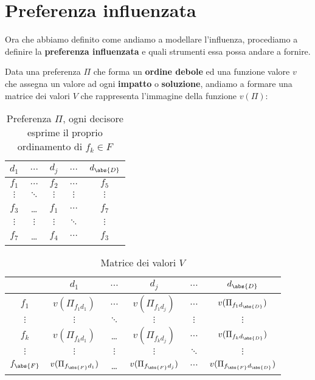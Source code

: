 \documentclass[\main/main.tex]{subfiles}
\begin{document}
\clearpage

\section{Preferenza influenzata}
Ora che abbiamo definito come andiamo a modellare l'influenza, procediamo a definire la \textbf{preferenza influenzata} e quali strumenti essa possa andare a fornire.

Data una preferenza $\Pi$ che forma un \textbf{ordine debole} ed una funzione valore $v$ che assegna un valore ad ogni \textbf{impatto} o \textbf{soluzione}, andiamo a formare una matrice dei valori $V$ che rappresenta l'immagine della funzione $v(\Pi)$:

\begin{table}
	\begin{tabular}{|c|c|c|c|c|}
		\hline
		$d_1$    & $\ldots$ & $d_j$    & $\ldots$ & $d_{\abs{D}}$ \\
		\hline
		$f_1$    & $\ldots$ & $f_2$    & $\ldots$ & $f_5$         \\
		\hline
		$\vdots$ & $\ddots$ & $\vdots$ & $\vdots$ & $\vdots$      \\
		\hline
		$f_3$    & \ldots   & $f_1$    & $\ldots$ & $f_7$         \\
		\hline
		$\vdots$ & $\vdots$ & $\vdots$ & $\ddots$ & $\vdots$      \\
		\hline
		$f_7$    & \ldots   & $f_4$    & $\ldots$ & $f_3$         \\
		\hline
	\end{tabular}
	\caption{Preferenza $\Pi$, ogni decisore esprime il proprio ordinamento di $f_k \in F$}
\end{table}

\begin{table}
	\begin{tabular}{|c|c|c|c|c|c|}
		\hline
		              & $d_1$                      & $\ldots$ & $d_j$                      & $\ldots$ & $d_{\abs{D}}$                      \\
		\hline
		$f_1$         & $v(\Pi_{f_1 d_1})$         & $\ldots$ & $v(\Pi_{f_1 d_j})$         & $\ldots$ & $v(\Pi_{f_1 d_{\abs{D}}})$         \\
		\hline
		$\vdots$      & $\vdots$                   & $\ddots$ & $\vdots$                   & $\vdots$ & $\vdots$                           \\
		\hline
		$f_k$         & $v(\Pi_{f_k d_1})$         & \ldots   & $v(\Pi_{f_k d_j})$         & $\ldots$ & $v(\Pi_{f_k d_{\abs{D}}})$         \\
		\hline
		$\vdots$      & $\vdots$                   & $\vdots$ & $\vdots$                   & $\ddots$ & $\vdots$                           \\
		\hline
		$f_{\abs{F}}$ & $v(\Pi_{f_{\abs{F}} d_1})$ & \ldots   & $v(\Pi_{f_{\abs{F}} d_j})$ & $\ldots$ & $v(\Pi_{f_{\abs{F}} d_{\abs{D}}})$ \\
		\hline
	\end{tabular}
	\caption{Matrice dei valori $V$}
\end{table}
\end{document}
